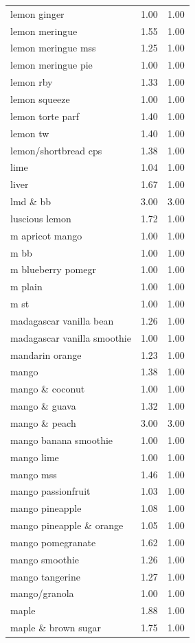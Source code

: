 \begin{table}
\begin{tabular}{lrr}
lemon ginger & 1.00 & 1.00 \\
lemon meringue & 1.55 & 1.00 \\
lemon meringue mss & 1.25 & 1.00 \\
lemon meringue pie & 1.00 & 1.00 \\
lemon rby & 1.33 & 1.00 \\
lemon squeeze & 1.00 & 1.00 \\
lemon torte parf & 1.40 & 1.00 \\
lemon tw & 1.40 & 1.00 \\
lemon/shortbread cps & 1.38 & 1.00 \\
lime & 1.04 & 1.00 \\
liver & 1.67 & 1.00 \\
lmd \& bb & 3.00 & 3.00 \\
luscious lemon & 1.72 & 1.00 \\
m apricot mango & 1.00 & 1.00 \\
m bb & 1.00 & 1.00 \\
m blueberry pomegr & 1.00 & 1.00 \\
m plain & 1.00 & 1.00 \\
m st & 1.00 & 1.00 \\
madagascar vanilla bean & 1.26 & 1.00 \\
madagascar vanilla smoothie & 1.00 & 1.00 \\
mandarin orange & 1.23 & 1.00 \\
mango & 1.38 & 1.00 \\
mango \& coconut & 1.00 & 1.00 \\
mango \& guava & 1.32 & 1.00 \\
mango \& peach & 3.00 & 3.00 \\
mango banana smoothie & 1.00 & 1.00 \\
mango lime & 1.00 & 1.00 \\
mango mss & 1.46 & 1.00 \\
mango passionfruit & 1.03 & 1.00 \\
mango pineapple & 1.08 & 1.00 \\
mango pineapple \& orange & 1.05 & 1.00 \\
mango pomegranate & 1.62 & 1.00 \\
mango smoothie & 1.26 & 1.00 \\
mango tangerine & 1.27 & 1.00 \\
mango/granola & 1.00 & 1.00 \\
maple & 1.88 & 1.00 \\
maple \& brown sugar & 1.75 & 1.00 \\

\end{tabular}
\end{table}
